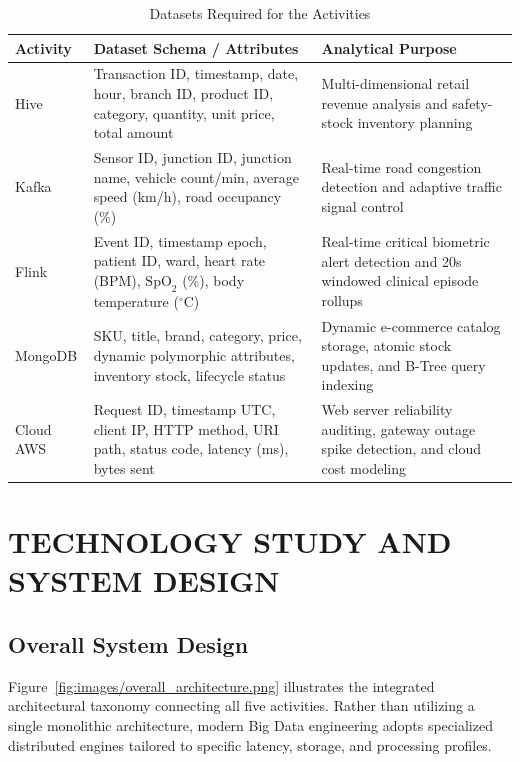 \documentclass[12pt,a4paper]{report}
\begin{document}
\begin{table}[H]
\centering
\caption{Datasets Required for the Activities}
\label{tab:data_requirements}
\begin{tabularx}{\textwidth}{|l|X|X|}
\hline
\textbf{Activity} & \textbf{Dataset Schema / Attributes} & \textbf{Analytical Purpose}\\
\hline
Hive & Transaction ID, timestamp, date, hour, branch ID, product ID, category, quantity, unit price, total amount & Multi-dimensional retail revenue analysis and safety-stock inventory planning\\
\hline
Kafka & Sensor ID, junction ID, junction name, vehicle count/min, average speed (km/h), road occupancy (\%) & Real-time road congestion detection and adaptive traffic signal control\\
\hline
Flink & Event ID, timestamp epoch, patient ID, ward, heart rate (BPM), $\text{SpO}_2$ (\%), body temperature ($^\circ$C) & Real-time critical biometric alert detection and 20s windowed clinical episode rollups\\
\hline
MongoDB & SKU, title, brand, category, price, dynamic polymorphic attributes, inventory stock, lifecycle status & Dynamic e-commerce catalog storage, atomic stock updates, and B-Tree query indexing\\
\hline
Cloud AWS & Request ID, timestamp UTC, client IP, HTTP method, URI path, status code, latency (ms), bytes sent & Web server reliability auditing, gateway outage spike detection, and cloud cost modeling\\
\hline
\end{tabularx}
\end{table}

\chapter{TECHNOLOGY STUDY AND SYSTEM DESIGN}

\section{Overall System Design}
Figure~\ref{fig:images/overall_architecture.png} illustrates the integrated architectural taxonomy connecting all five activities. Rather than utilizing a single monolithic architecture, modern Big Data engineering adopts specialized distributed engines tailored to specific latency, storage, and processing profiles.
\end{document}
